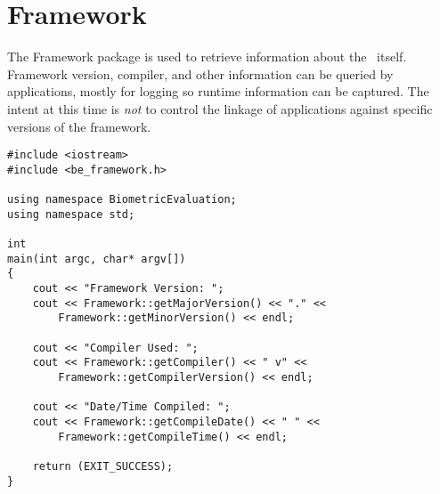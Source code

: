 %
%
\chapter{Framework}
The Framework package is used to retrieve information about the \lname\ itself.
Framework version, compiler, and other information can be queried by
applications, mostly
for logging so runtime information can be captured. The intent at this time
is {\em not} to control the linkage of applications against specific
versions of the framework.
\label{chp-framework}

\begin{lstlisting}[caption={Using a the Framework API}, label=frameworkuse]
#include <iostream>
#include <be_framework.h>

using namespace BiometricEvaluation;
using namespace std;

int
main(int argc, char* argv[])
{
    cout << "Framework Version: ";
    cout << Framework::getMajorVersion() << "." <<
        Framework::getMinorVersion() << endl;

    cout << "Compiler Used: ";
    cout << Framework::getCompiler() << " v" <<
        Framework::getCompilerVersion() << endl;

    cout << "Date/Time Compiled: ";
    cout << Framework::getCompileDate() << " " <<
        Framework::getCompileTime() << endl;

    return (EXIT_SUCCESS);
}
\end{lstlisting}
